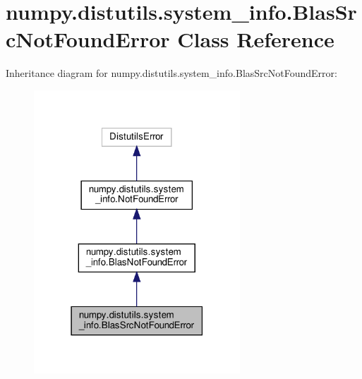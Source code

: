 \hypertarget{classnumpy_1_1distutils_1_1system__info_1_1BlasSrcNotFoundError}{}\section{numpy.\+distutils.\+system\+\_\+info.\+Blas\+Src\+Not\+Found\+Error Class Reference}
\label{classnumpy_1_1distutils_1_1system__info_1_1BlasSrcNotFoundError}


Inheritance diagram for numpy.\+distutils.\+system\+\_\+info.\+Blas\+Src\+Not\+Found\+Error\+:
\nopagebreak
\begin{figure}[H]
\begin{center}
\leavevmode
\includegraphics[width=219pt]{classnumpy_1_1distutils_1_1system__info_1_1BlasSrcNotFoundError__inherit__graph}
\end{center}
\end{figure}


